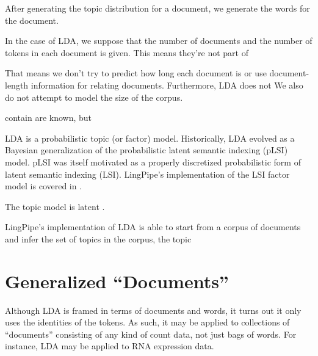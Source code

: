 After generating the topic distribution for a document, we generate
the words for the document.  

In the case of LDA, we suppose that the number of documents and the
number of tokens in each document is given.  This means they're
not part of 

That means we don't try
to predict how long each document is or use document-length
information for relating documents.  Furthermore, LDA does not We also do not attempt to model
the size of the corpus.


contain are known, but 


LDA is a probabilistic topic (or factor) model.  Historically, LDA
evolved as a Bayesian generalization of the probabilistic latent
semantic indexing (pLSI) model.  pLSI was itself motivated as a
properly discretized probabilistic form of latent semantic indexing
(LSI).  LingPipe's implementation of the LSI factor model is covered
in .

The topic model is latent .

LingPipe's implementation of LDA is able to start from a corpus of
documents and infer the set of topics in the corpus, the topic



\section{Generalized ``Documents''}

Although LDA is framed in terms of documents and words, it turns out
it only uses the identities of the tokens.  As such, it may be applied
to collections of ``documents'' consisting of any kind of count data,
not just bags of words.  For instance, LDA may be applied to RNA
expression data.

